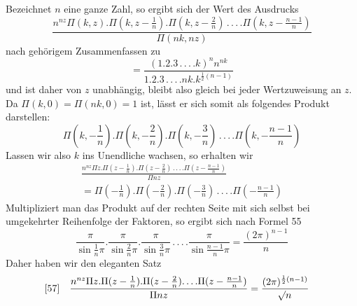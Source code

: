 Bezeichnet $n$ eine ganze Zahl, so ergibt sich der Wert des Ausdrucks
\[
\frac{n^{nz}\Pi(k,z).\Pi(k,z-\frac1n).\Pi(k,z-\frac2n)
\,.\,.\,.\,.\Pi(k,z-\frac{n-1}{n})}{\Pi(nk,nz)}
\]
nach gehörigem Zusammenfassen zu
\[
=\frac{(1.2.3\,.\,.\,.\,.k)^n n^{nk}}
{1.2.3\,.\,.\,.\,.nk.k^{\frac12(n-1)}}
\]
und ist daher von $z$ unabhängig, bleibt also gleich bei jeder Wertzuweisung an $z$. Da $\Pi(k,0)=\Pi(nk,0)=1$ ist, lässt er sich somit als folgendes Produkt darstellen:
\[
\Pi(k,-\frac1n).\Pi(k,-\frac2n).\Pi(k,-\frac3n)
\,.\,.\,.\,.\Pi(k,-\frac{n-1}{n})
\]
Lassen wir also $k$ ins Unendliche wachsen, so erhalten wir
\[
\begin{gathered}
\frac{n^{nz}\Pi z.\Pi(z-\frac1n).\Pi(z-\frac2n)
\,.\,.\,.\,.\Pi(z-\frac{n-1}{n})}{\Pi nz}\\[4pt]
=\Pi(-\frac1n).\Pi(-\frac2n).\Pi(-\frac3n)
\,.\,.\,.\,.\Pi(-\frac{n-1}{n})
\end{gathered}
\]
Multipliziert man das Produkt auf der rechten Seite mit sich selbst bei umgekehrter Reihenfolge der Faktoren, so ergibt sich nach Formel 55
\[
\frac{\pi}{\sin\frac1n\pi}.\frac{\pi}{\sin\frac2n\pi}.
\frac{\pi}{\sin\frac3n\pi}\,.\,.\,.\,.
\frac{\pi}{\sin\frac{n-1}{n}\pi}=\frac{(2\pi)^{n-1}}{n}
\]
Daher haben wir den eleganten Satz
\[
\begin{aligned}
{}\text{[57]}\quad &
\frac{n^{nz}\Pi z.\Pi(z-\frac1n).\Pi(z-\frac2n).\,.\,.\,.
\Pi(z-\frac{n-1}{n})}{\Pi nz}
=\frac{(2\pi)^{\frac12(n-1)}}{\mathord{{}^{}\!\surd}n}
\end{aligned}
\]

